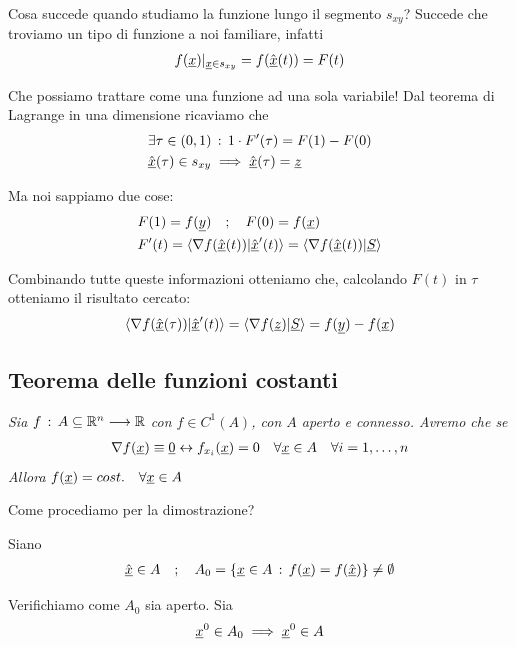 Cosa succede quando studiamo la funzione lungo il segmento $s_{xy}$? Succede che troviamo un tipo di funzione a noi familiare, infatti
\begin{align}
	f(\underline{x})|_{\underline{x}\in s_{xy}}=f(\hat{\underline{x}}(t))=F(t)
\end{align}

Che possiamo trattare come una funzione ad una sola variabile! 
Dal teorema di Lagrange in una dimensione ricaviamo che
\begin{align}
	{}&\exists \tau \in (0,1) \, : \, 1 \cdot F'(\tau)=F(1)- F(0)\\
	&\hat{\underline{x}}(\tau)\in s_{xy}\implies \hat{\underline{x}}(\tau)=\underline{z}
\end{align}

Ma noi sappiamo due cose:
\begin{align}
	{}&F(1)=f(\underline{y}) \quad ; \quad F(0)=f(\underline{x})\\
	&F'(t)= \braket{\nabla f(\hat{\underline{x}}(t))|\hat{\underline{x}}'(t)} = \braket{\nabla f(\hat{\underline{x}}(t))|\underline{S}}
\end{align}

Combinando tutte queste informazioni otteniamo che, calcolando $F(t)$ in $\tau$ otteniamo il risultato cercato:
\begin{align}
	\braket{\nabla f(\hat{\underline{x}}(\tau))|\hat{\underline{x}}'(t)}=\braket{\nabla f(\underline{z})|\underline{S}}= f(\underline{y}) - f(\underline{x})
\end{align}

\subsection{Teorema delle funzioni costanti}

\textit{Sia $f \, : \, A \subseteq \mathbb{R}^n\longrightarrow \mathbb{R}$ con $f\in C^1(A)$, con $A$ aperto e connesso. Avremo che se }
\begin{align}
	\nabla f(\underline{x}) \equiv \underline{0} \leftrightarrow f_{x_i}(\underline{x})=0 \quad \forall \underline{x} \in A \quad \forall i=1,\dots,n
\end{align}
\textit{Allora} $f(\underline{x}) = cost. \quad \forall \underline{x} \in A$

\bigskip
Come procediamo per la dimostrazione?
\bigskip

Siano
\begin{align}
	\hat{\underline{x}}\in A \quad ; \quad A_0=\{ \underline{x}\in A \, : \, f(\underline{x}) = f(\hat{\underline{x}}) \} \neq \emptyset
\end{align}

Verifichiamo come $A_0$ sia aperto. Sia 
\begin{align}
	\underline{x}^0\in A_0 \implies \underline{x}^0 \in A
\end{align}

